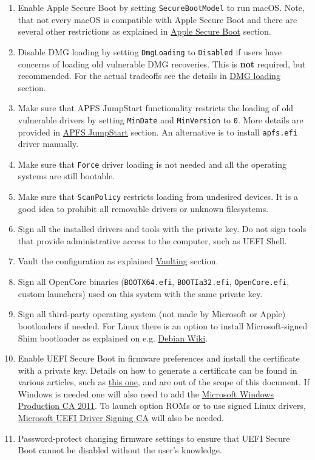 \documentclass[]{article}
\begin{document}
\begin{enumerate}
\item Enable Apple Secure Boot by setting \texttt{SecureBootModel} to
  run macOS. Note, that not every macOS is compatible with Apple Secure Boot and
  there are several other restrictions as explained in
  \hyperref[secureapplesb]{Apple Secure Boot} section.
\item Disable DMG loading by setting \texttt{DmgLoading} to \texttt{Disabled}
  if users have concerns of loading old vulnerable DMG recoveries. This is
  \textbf{not} required, but recommended. For the actual tradeoffs
  see the details in \hyperref[securedmgloading]{DMG loading} section.
\item Make sure that APFS JumpStart functionality restricts the loading
  of old vulnerable drivers by setting \texttt{MinDate} and \texttt{MinVersion}
  to \texttt{0}. More details are provided in \hyperref[uefiapfsprops]{APFS JumpStart}
  section. An alternative is to install \texttt{apfs.efi} driver manually.
\item Make sure that \texttt{Force} driver loading is not needed and
  all the operating systems are still bootable.
\item Make sure that \texttt{ScanPolicy} restricts loading from undesired
  devices. It is a good idea to prohibit all removable drivers or unknown
  filesystems.
\item Sign all the installed drivers and tools with the private key. Do not sign
  tools that provide administrative access to the computer, such as UEFI Shell.
\item Vault the configuration as explained \hyperref[securevaulting]{Vaulting}
  section.
\item Sign all OpenCore binaries (\texttt{BOOTX64.efi}, \texttt{BOOTIa32.efi},
  \texttt{OpenCore.efi}, custom launchers) used on this system with
  the same private key.
\item Sign all third-party operating system (not made by Microsoft or Apple)
  bootloaders if needed. For Linux there is an option to install
  Microsoft-signed Shim bootloader as explained on e.g.
  \href{https://wiki.debian.org/SecureBoot}{Debian Wiki}.
\item Enable UEFI Secure Boot in firmware preferences and install the
  certificate with a private key. Details on how to generate a certificate
  can be found in various articles, such as \href{https://habr.com/en/post/273497}{this one},
  and are out of the scope of this document. If Windows is needed one
  will also need to add the
  \href{http://go.microsoft.com/fwlink/?LinkID=321192}{Microsoft Windows Production CA 2011}.
  To launch option ROMs or to use signed Linux drivers,
  \href{http://go.microsoft.com/fwlink/?LinkId=321194}{Microsoft UEFI Driver Signing CA} will also be needed.
\item Password-protect changing firmware settings to ensure that UEFI Secure Boot
  cannot be disabled without the user's knowledge.
\end{enumerate}
\end{document}
